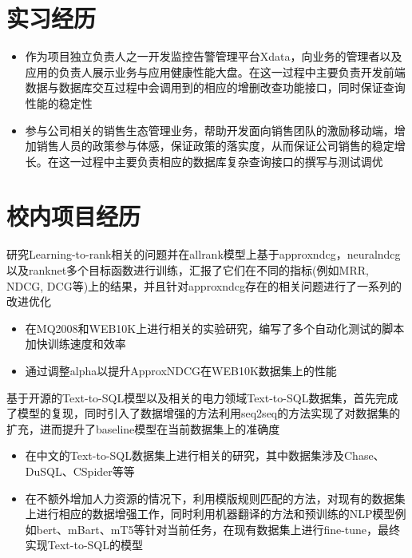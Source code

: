 \documentclass{resume}
\begin{document}
\section{实习经历}
\begin{itemize}
  \item 作为项目独立负责人之一开发监控告警管理平台Xdata，向业务的管理者以及应用的负责人展示业务与应用健康性能大盘。在这一过程中主要负责开发前端数据与数据库交互过程中会调用到的相应的增删改查功能接口，同时保证查询性能的稳定性
  \item 参与公司相关的销售生态管理业务，帮助开发面向销售团队的激励移动端，增加销售人员的政策参与体感，保证政策的落实度，从而保证公司销售的稳定增长。在这一过程中主要负责相应的数据库复杂查询接口的撰写与测试调优
\end{itemize}

\section{校内项目经历}

研究Learning-to-rank相关的问题并在allrank模型上基于approxndcg，neuralndcg以及ranknet多个目标函数进行训练，汇报了它们在不同的指标(例如MRR, NDCG, DCG等)上的结果，并且针对approxndcg存在的相关问题进行了一系列的改进优化
\begin{onehalfspacing}
\begin{itemize}
    \item 在MQ2008和WEB10K上进行相关的实验研究，编写了多个自动化测试的脚本加快训练速度和效率
    \item 通过调整alpha以提升ApproxNDCG在WEB10K数据集上的性能
\end{itemize}
\end{onehalfspacing}



基于开源的Text-to-SQL模型以及相关的电力领域Text-to-SQL数据集，首先完成了模型的复现，同时引入了数据增强的方法利用seq2seq的方法实现了对数据集的扩充，进而提升了baseline模型在当前数据集上的准确度
\begin{onehalfspacing}
\begin{itemize}
  \item 在中文的Text-to-SQL数据集上进行相关的研究，其中数据集涉及Chase、DuSQL、CSpider等等
  \item 在不额外增加人力资源的情况下，利用模版规则匹配的方法，对现有的数据集上进行相应的数据增强工作，同时利用机器翻译的方法和预训练的NLP模型例如bert、mBart、mT5等针对当前任务，在现有数据集上进行fine-tune，最终实现Text-to-SQL的模型
\end{itemize}
\end{onehalfspacing}
\end{document}
